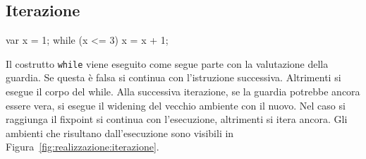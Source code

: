 \subsection{Iterazione}\label{sec:realizzazione:iterazione}
\begin{javascriptcode}
var x = 1;
while (x <= 3) {
    x = x + 1;
}
\end{javascriptcode}
Il costrutto \texttt{while} viene eseguito come segue parte con la valutazione della guardia. Se questa è falsa si continua con l'istruzione successiva. Altrimenti si esegue il corpo del while. Alla successiva iterazione, se la guardia potrebbe ancora essere vera, si esegue il widening del vecchio ambiente con il nuovo. Nel caso si raggiunga il fixpoint si continua con l'esecuzione, altrimenti si itera ancora. Gli ambienti che risultano dall'esecuzione sono visibili in Figura~\ref{fig:realizzazione:iterazione}.


